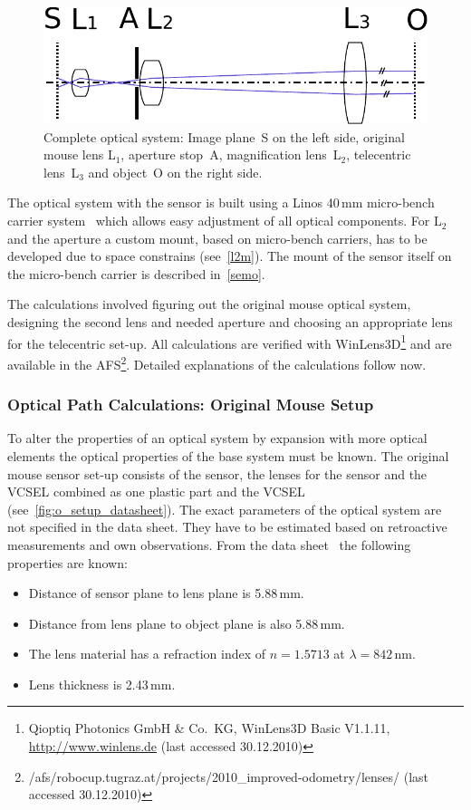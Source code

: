 \documentclass[12pt,a4paper]{article}
\begin{document}
\begin{figure}[htbp]
\begin{center}
\includegraphics[width=1\columnwidth]{figures/sketch-optic-simple}
\caption{\label{fig:sketch-optic-simple}
Complete optical system:
Image plane~S on the left side,
original mouse lens L$_1$,
aperture stop~A,
magnification lens~L$_2$,
telecentric lens~L$_3$ and object~O on the right side.
}
\end{center}
\end{figure}

The optical system with the sensor is built using a Linos 40\,mm micro-bench carrier system~\cite{microbench} which allows easy adjustment of all optical components.
For L$_2$ and the aperture a custom mount, based on micro-bench carriers, has to be developed due to space constrains (see~\autoref{l2m}).
The mount of the sensor itself on the micro-bench carrier is described in~\autoref{semo}.

The calculations involved figuring out the original mouse optical system, designing the second lens and needed aperture and choosing an appropriate lens for the telecentric set-up.
All calculations are verified with WinLens3D\footnote{Qioptiq Photonics GmbH \& Co.\ KG, WinLens3D Basic V1.1.11, \url{http://www.winlens.de} (last accessed 30.12.2010)} and are available in the AFS\footnote{/afs/robocup.tugraz.at/projects/2010\_improved-odometry/lenses/ (last accessed 30.12.2010)}.
Detailed explanations of the calculations follow now.

\subsubsection{Optical Path Calculations: Original Mouse Setup}

To alter the properties of an optical system by expansion with more optical elements the optical properties of the base system must be known.
The original mouse sensor set-up consists of the sensor, the lenses for the sensor and the VCSEL combined as one plastic part and the VCSEL (see~\autoref{fig:o_setup_datasheet}).
The exact parameters of the optical system are not specified in the data sheet.
They have to be estimated based on retroactive measurements and own observations.
From the data sheet~\cite{adns} the following properties are known: 
\begin{itemize}
  \item Distance of sensor plane to lens plane is 5.88\,mm.
  \item Distance from lens plane to object plane is also 5.88\,mm.
  \item The lens material has a refraction index of $n=1.5713$ at $\lambda=842$\,nm.
  \item Lens thickness is 2.43\,mm.
\end{itemize}
\end{document}
